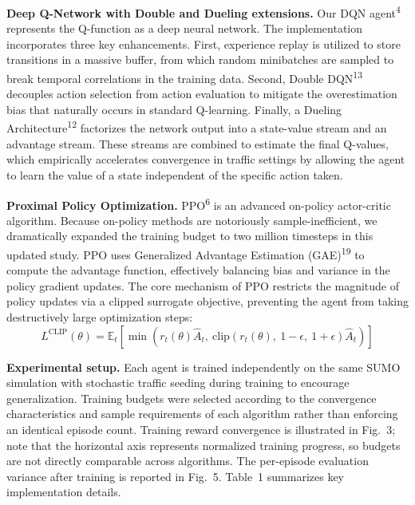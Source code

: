 \documentclass[10pt,a4paper]{article}
\begin{document}
\textbf{Deep Q-Network with Double and Dueling extensions.}
Our DQN agent\textsuperscript{4} represents the Q-function as a deep neural network. The implementation incorporates three key enhancements. First, experience replay is utilized to store transitions in a massive buffer, from which random minibatches are sampled to break temporal correlations in the training data. Second, Double DQN\textsuperscript{13} decouples action selection from action evaluation to mitigate the overestimation bias that naturally occurs in standard Q-learning. Finally, a Dueling Architecture\textsuperscript{12} factorizes the network output into a state-value stream and an advantage stream. These streams are combined to estimate the final Q-values, which empirically accelerates convergence in traffic settings by allowing the agent to learn the value of a state independent of the specific action taken.

\textbf{Proximal Policy Optimization.}
PPO\textsuperscript{6} is an advanced on-policy actor-critic algorithm. Because on-policy methods are notoriously sample-inefficient, we dramatically expanded the training budget to two million timesteps in this updated study. PPO uses Generalized Advantage Estimation (GAE)\textsuperscript{19} to compute the advantage function, effectively balancing bias and variance in the policy gradient updates. The core mechanism of PPO restricts the magnitude of policy updates via a clipped surrogate objective, preventing the agent from taking destructively large optimization steps:
\begin{equation}
    L^{\text{CLIP}}(\theta) = \mathbb{E}_t\left[\min\left(r_t(\theta)\hat{A}_t,\ \text{clip}(r_t(\theta),\ 1-\epsilon,\ 1+\epsilon)\hat{A}_t\right)\right]
\end{equation}

\textbf{Experimental setup.}
Each agent is trained independently on the same SUMO simulation with stochastic traffic seeding during training to encourage generalization. Training budgets were selected according to the convergence characteristics and sample requirements of each algorithm rather than enforcing an identical episode count. Training reward convergence is illustrated in Fig.~3; note that the horizontal axis represents normalized training progress, so budgets are not directly comparable across algorithms. The per-episode evaluation variance after training is reported in Fig.~5. Table~1 summarizes key implementation details.
\end{document}

